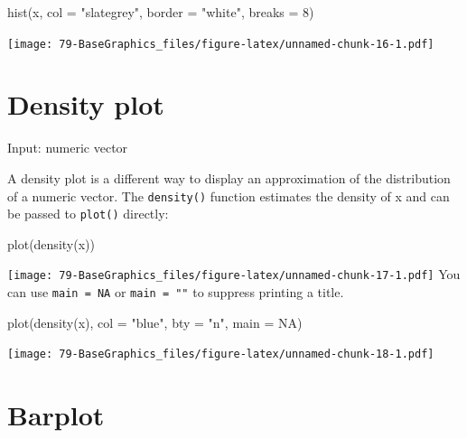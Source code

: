 \documentclass[
]{book}
\newenvironment{Shaded}{\begin{snugshade}}{\end{snugshade}}
\newcommand{\AttributeTok}[1]{\textcolor[rgb]{0.77,0.63,0.00}{#1}}
\newcommand{\ConstantTok}[1]{\textcolor[rgb]{0.00,0.00,0.00}{#1}}
\newcommand{\DecValTok}[1]{\textcolor[rgb]{0.00,0.00,0.81}{#1}}
\newcommand{\FunctionTok}[1]{\textcolor[rgb]{0.00,0.00,0.00}{#1}}
\newcommand{\NormalTok}[1]{#1}
\newcommand{\StringTok}[1]{\textcolor[rgb]{0.31,0.60,0.02}{#1}}
\begin{document}
\begin{Shaded}
\begin{Highlighting}[]
\FunctionTok{hist}\NormalTok{(x, }\AttributeTok{col =} \StringTok{"slategrey"}\NormalTok{, }\AttributeTok{border =} \StringTok{"white"}\NormalTok{,}
     \AttributeTok{breaks =} \DecValTok{8}\NormalTok{)}
\end{Highlighting}
\end{Shaded}

\texttt{[image: 79-BaseGraphics\_files/figure-latex/unnamed-chunk-16-1.pdf]}

\hypertarget{density-plot}{%
\section{Density plot}\label{density-plot}}

Input: numeric vector

A density plot is a different way to display an approximation of the distribution of a numeric vector. The \texttt{density()} function estimates the density of x and can be passed to \texttt{plot()} directly:

\begin{Shaded}
\begin{Highlighting}[]
\FunctionTok{plot}\NormalTok{(}\FunctionTok{density}\NormalTok{(x))}
\end{Highlighting}
\end{Shaded}

\texttt{[image: 79-BaseGraphics\_files/figure-latex/unnamed-chunk-17-1.pdf]}
You can use \texttt{main\ =\ NA} or \texttt{main\ =\ ""} to suppress printing a title.

\begin{Shaded}
\begin{Highlighting}[]
\FunctionTok{plot}\NormalTok{(}\FunctionTok{density}\NormalTok{(x), }\AttributeTok{col =} \StringTok{"blue"}\NormalTok{,}
     \AttributeTok{bty =} \StringTok{"n"}\NormalTok{,}
     \AttributeTok{main =} \ConstantTok{NA}\NormalTok{)}
\end{Highlighting}
\end{Shaded}

\texttt{[image: 79-BaseGraphics\_files/figure-latex/unnamed-chunk-18-1.pdf]}

\hypertarget{barplot}{%
\section{Barplot}\label{barplot}}
\end{document}
